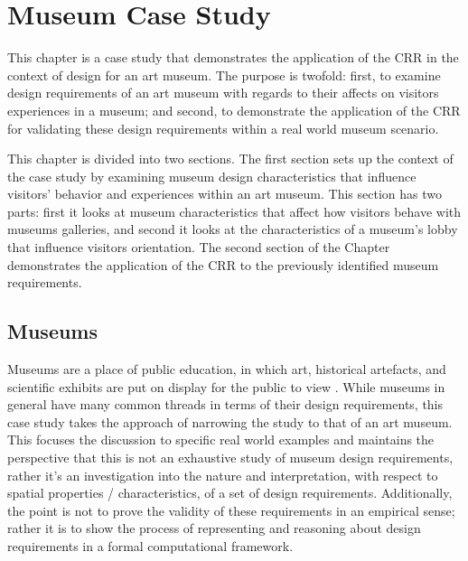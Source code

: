 \documentclass[12pt]{ucthesis}
\begin{document}
\chapter{Museum Case Study}
This chapter is a case study that demonstrates the application of the CRR in the context of design for an art museum. The purpose is twofold: first, to examine design requirements of an art museum with regards to their affects on visitors experiences in a museum; and second, to demonstrate the application of the CRR for validating these design requirements within a real world museum scenario. 


This chapter is divided into two sections. The first section sets up the context of the case study by examining museum design characteristics that influence visitors' behavior and experiences within an art museum. This section has two parts: first it looks at museum characteristics that affect how visitors behave with museums galleries, and second it looks at the characteristics of a museum's lobby that influence visitors orientation. The second section of the Chapter demonstrates the application of the CRR to the previously identified museum requirements.  



\section{Museums}
Museums are a place of public education, in which art, historical artefacts, and scientific exhibits are put on display for the public to view \cite{Falk}. While museums in general have many common threads in terms of their design requirements, this case study takes the approach of narrowing the study to that of an art museum. This focuses the discussion to specific real world examples and maintains the perspective that this is not an exhaustive study of museum design requirements, rather it's an investigation into the nature and interpretation, with respect to spatial properties / characteristics, of a set of design requirements. Additionally, the point is not to prove the validity of these requirements in an empirical sense; rather it is to show the process of representing and reasoning about design requirements in a formal computational framework.
\end{document}
